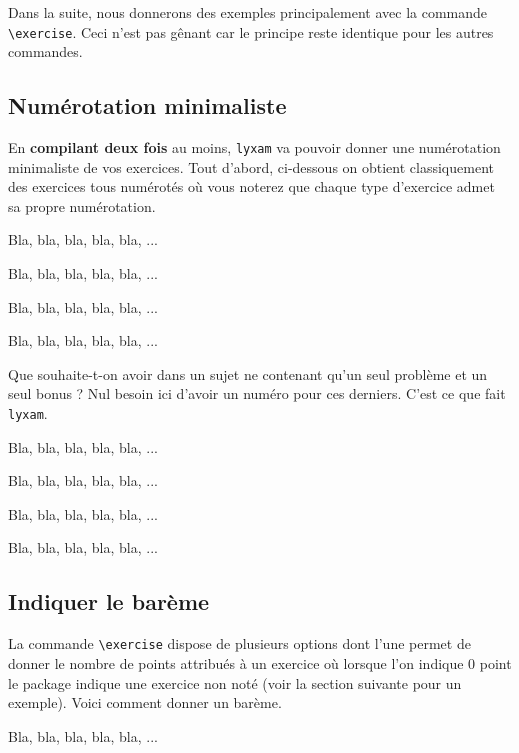 \documentclass[12pt,a4paper]{scrartcl}
\makeatletter
\theoremstyle{definition}
\newcommand\resetallcnt{
    	\setcounter{lyxam@counter@topic}{0}
    	\setcounter{lyxam@counter@exercise}{0}
    	\setcounter{lyxam@counter@problem}{0}
    	\setcounter{lyxam@counter@bonus}{0}
    	\setcounter{lyxam@counter@subpart}{0}
    }
\makeatother
\begin{document}
Dans la suite, nous donnerons des exemples principalement avec la commande \verb+\exercise+. Ceci n'est pas gênant car le principe reste identique pour les autres commandes.


    \subsection{Numérotation minimaliste}

En \textbf{compilant deux fois} au moins, \verb+lyxam+ va pouvoir donner une numérotation minimaliste de vos exercices. Tout d'abord, ci-dessous on obtient classiquement des exercices tous numérotés où vous noterez que chaque type d'exercice admet sa propre numérotation.


\begin{tcblisting}{}
\exercise
Bla, bla, bla, bla, bla, ...

\exercise
Bla, bla, bla, bla, bla, ...

\problem
Bla, bla, bla, bla, bla, ...

\problem
Bla, bla, bla, bla, bla, ...
\end{tcblisting}


Que souhaite-t-on avoir dans un sujet ne contenant qu'un seul problème et un seul bonus ? Nul besoin ici d'avoir un numéro pour ces derniers. C'est ce que fait \verb+lyxam+.

\resetallcnt{}

\begin{tcblisting}{}
\exercise
Bla, bla, bla, bla, bla, ...

\exercise
Bla, bla, bla, bla, bla, ...

\problem
Bla, bla, bla, bla, bla, ...

\bonus
Bla, bla, bla, bla, bla, ...
\end{tcblisting}



    \subsection{Indiquer le barème}

La commande \verb+\exercise+ dispose de plusieurs options dont l'une permet de donner le nombre de points attribués à un exercice où lorsque l'on indique $0$ point le package indique une exercice non noté (voir la section suivante pour un exemple). Voici comment donner un barème.

\resetallcnt{}

\begin{tcblisting}{}
\exercise[pts = 5]
Bla, bla, bla, bla, bla, ...
\end{tcblisting}
\end{document}
